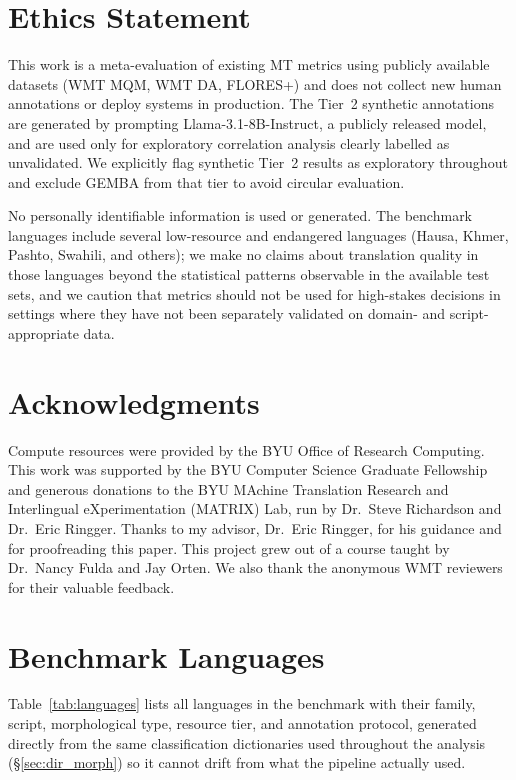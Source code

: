 \documentclass[11pt]{article}
\begin{document}
\section*{Ethics Statement}

This work is a meta-evaluation of existing MT metrics using publicly available datasets (WMT MQM, WMT DA, FLORES+) and does not collect new human annotations or deploy systems in production.
The Tier~2 synthetic annotations are generated by prompting Llama-3.1-8B-Instruct, a publicly released model, and are used only for exploratory correlation analysis clearly labelled as unvalidated.
We explicitly flag synthetic Tier~2 results as exploratory throughout and exclude GEMBA from that tier to avoid circular evaluation.

No personally identifiable information is used or generated.
The benchmark languages include several low-resource and endangered languages (Hausa, Khmer, Pashto, Swahili, and others); we make no claims about translation quality in those languages beyond the statistical patterns observable in the available test sets, and we caution that metrics should not be used for high-stakes decisions in settings where they have not been separately validated on domain- and script-appropriate data.

\section*{Acknowledgments}

Compute resources were provided by the BYU Office of Research Computing. This work was supported by the BYU Computer Science Graduate Fellowship and generous donations to the BYU MAchine Translation Research and Interlingual eXperimentation (MATRIX) Lab, run by Dr.\ Steve Richardson and Dr.\ Eric Ringger. Thanks to my advisor, Dr.\ Eric Ringger, for his guidance and for proofreading this paper. This project grew out of a course taught by Dr.\ Nancy Fulda and Jay Orten. We also thank the anonymous WMT reviewers for their valuable feedback.



\clearpage
\onecolumn
\appendix

\section{Benchmark Languages}
\label{app:languages}

Table~\ref{tab:languages} lists all languages in the benchmark with their family, script, morphological type, resource tier, and annotation protocol, generated directly from the same classification dictionaries used throughout the analysis (\S\ref{sec:dir_morph}) so it cannot drift from what the pipeline actually used.
\end{document}
